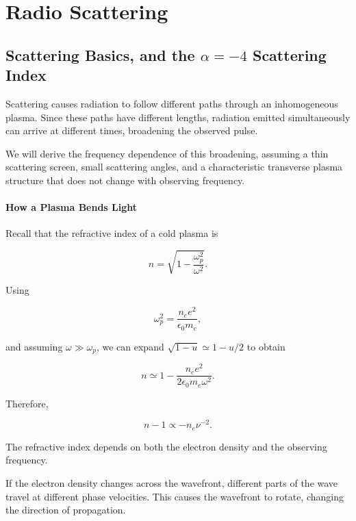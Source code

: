 
\chapter{Radio Scattering}

\section{Scattering Basics, and the $\alpha=-4$ Scattering Index}

Scattering causes radiation to follow different paths
through an inhomogeneous plasma. Since these paths have
different lengths, radiation emitted simultaneously can
arrive at different times, broadening the observed pulse.

We will derive the frequency dependence of this
broadening, assuming a thin scattering screen, small
scattering angles, and a characteristic transverse plasma
structure that does not change with observing frequency.

\subsubsection{How a Plasma Bends Light}

Recall that the refractive index of a cold plasma is

\begin{equation}
n=\sqrt{1-\frac{\omega_p^2}{\omega^2}}.
\end{equation}

Using

\begin{equation}
\omega_p^2=\frac{n_e e^2}{\epsilon_0 m_e},
\end{equation}

and assuming $\omega\gg\omega_p$, we can expand
$\sqrt{1-u}\simeq 1-u/2$ to obtain

\begin{equation}
n \simeq 1 -
\frac{n_e e^2}{2\epsilon_0 m_e\omega^2}.
\end{equation}

Therefore,

\begin{equation}
\boxed{n-1\propto -n_e\nu^{-2}.}
\end{equation}

The refractive index depends on both the electron
density and the observing frequency.

If the electron density changes across the wavefront,
different parts of the wave travel at different phase
velocities. This causes the wavefront to rotate,
changing the direction of propagation.

